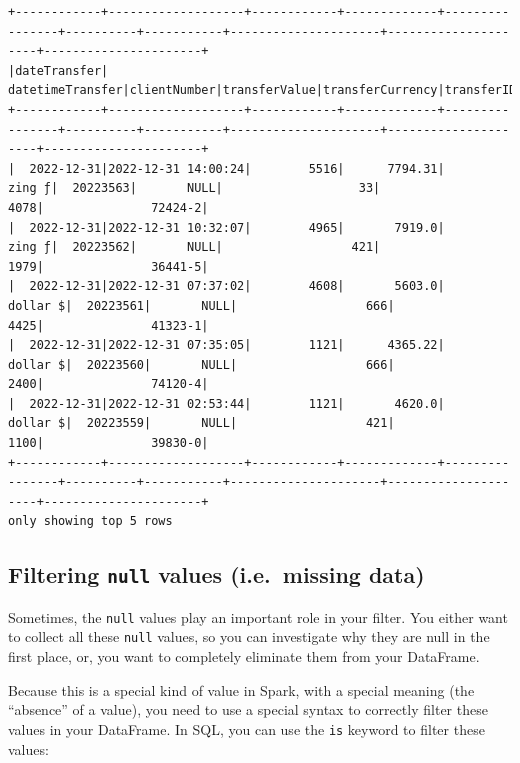 \documentclass[
  11pt,
  letterpaper,
  DIV=11,
  numbers=noendperiod]{scrreprt}
\begin{document}
\begin{verbatim}
+------------+-------------------+------------+-------------+----------------+----------+-----------+---------------------+---------------------+----------------------+
|dateTransfer|   datetimeTransfer|clientNumber|transferValue|transferCurrency|transferID|transferLog|destinationBankNumber|destinationBankBranch|destinationBankAccount|
+------------+-------------------+------------+-------------+----------------+----------+-----------+---------------------+---------------------+----------------------+
|  2022-12-31|2022-12-31 14:00:24|        5516|      7794.31|          zing ƒ|  20223563|       NULL|                   33|                 4078|               72424-2|
|  2022-12-31|2022-12-31 10:32:07|        4965|       7919.0|          zing ƒ|  20223562|       NULL|                  421|                 1979|               36441-5|
|  2022-12-31|2022-12-31 07:37:02|        4608|       5603.0|        dollar $|  20223561|       NULL|                  666|                 4425|               41323-1|
|  2022-12-31|2022-12-31 07:35:05|        1121|      4365.22|        dollar $|  20223560|       NULL|                  666|                 2400|               74120-4|
|  2022-12-31|2022-12-31 02:53:44|        1121|       4620.0|        dollar $|  20223559|       NULL|                  421|                 1100|               39830-0|
+------------+-------------------+------------+-------------+----------------+----------+-----------+---------------------+---------------------+----------------------+
only showing top 5 rows
\end{verbatim}

\hypertarget{sec-filter-null-values}{%
\subsection{\texorpdfstring{Filtering \texttt{null} values (i.e.~missing
data)}{Filtering null values (i.e.~missing data)}}\label{sec-filter-null-values}}

Sometimes, the \texttt{null} values play an important role in your
filter. You either want to collect all these \texttt{null} values, so
you can investigate why they are null in the first place, or, you want
to completely eliminate them from your DataFrame.

Because this is a special kind of value in Spark, with a special meaning
(the ``absence'' of a value), you need to use a special syntax to
correctly filter these values in your DataFrame. In SQL, you can use the
\texttt{is} keyword to filter these values:
\end{document}
